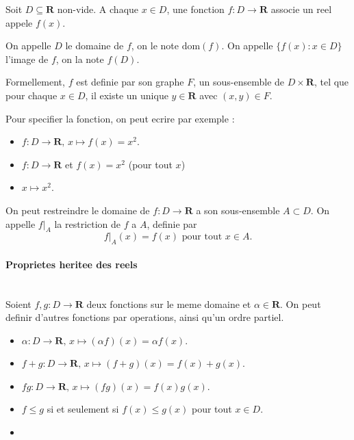 \begin{definition}
Soit $D\subseteq \mathbf{R}$ non-vide. A chaque $x \in D$, une fonction $f:D\to \mathbf{R}$ associe un reel appele $f(x)$.

On appelle $D$ le domaine de $f$, on le note $\mathrm{dom}(f)$. On appelle $\{ f(x):x \in D \}$ l'image de $f$, on la note $f(D)$.
\end{definition}
\begin{remark}
Formellement, $f$ est definie par son graphe $F$, un sous-ensemble de $D\times \mathbf{R}$, tel que pour chaque $x \in D$, il existe un unique $y\in \mathbf{R}$ avec $(x,y)\in F$.
\end{remark}
\begin{notation}
Pour specifier la fonction, on peut ecrire par exemple :
\begin{itemize}
\item $f:D\to \mathbf{R},\,x\mapsto f(x)=x^{2}$.
\item $f:D\to \mathbf{R}$ et $f(x)=x^{2}$ (pour tout $x$)
\item $x\mapsto x^{2}$.
\end{itemize}
\end{notation}
\begin{definition}
On peut restreindre le domaine de $f:D\to \mathbf{R}$ a son sous-ensemble $A\subset D$. On appelle $f|_{A}$ la restriction de $f$ a $A$, definie par
$$
f|_{A}(x)=f(x)\text{ pour tout }x \in A.
$$
\end{definition}

\paragraph{Proprietes heritee des reels}~\\
Soient $f,g:D\to \mathbf{R}$ deux fonctions sur le meme domaine et $\alpha \in \mathbf{R}$. On peut definir d'autres fonctions par operations, ainsi qu'un ordre partiel.
\begin{itemize}
\item $\alpha:D\to \mathbf{R},\, x\mapsto(\alpha f)(x)=\alpha f(x).$
\item $f+g:D\to \mathbf{R},\,x\mapsto(f+g)(x)=f(x)+g(x)$.
\item $fg:D\to \mathbf{R},\,x\mapsto(fg)(x)=f(x)g(x)$.
\item $f\le g$ si et seulement si $f(x)\le g(x)$ pour tout $x \in D$.
\item 
\end{itemize}

